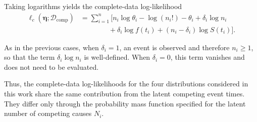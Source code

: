 Taking logarithms yields the complete-data log-likelihood
\begin{align}
\ell_c
\left(
\boldsymbol{\eta};
\mathcal{D}_{\mathrm{comp}}
\right)
&=
\sum_{i=1}^n
\Big[
n_i\log\theta_i
-
\log(n_i!)
-
\theta_i
+
\delta_i\log n_i
\nonumber\\
&\qquad\qquad
+
\delta_i\log f(t_i)
+
(n_i-\delta_i)\log S(t_i)
\Big].
\label{eq:poisson_complete_loglikelihood}
\end{align}

As in the previous cases, when $\delta_i=1$, an event is observed and
therefore $n_i\geq1$, so that the term $\delta_i\log n_i$ is well-defined.
When $\delta_i=0$, this term vanishes and does not need to be evaluated.

Thus, the complete-data log-likelihoods for the four distributions
considered in this work share the same contribution from the latent
competing event times. They differ only through the probability mass
function specified for the latent number of competing causes $N_i$.
